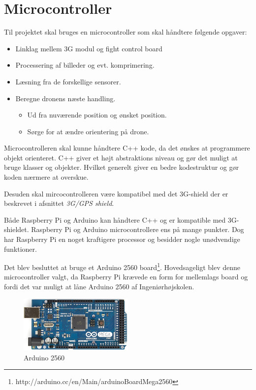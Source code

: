 \section{Microcontroller}

Til projektet skal bruges en microcontroller som skal håndtere følgende opgaver:  
\begin{itemize}
	\item Linklag mellem 3G modul og fight control board
	\item Processering af billeder og evt. komprimering.
	\item Læsning fra de forskellige sensorer.
	\item Beregne dronens næste handling. 
	\begin{itemize}
		\item Ud fra nuværende position og ønsket position.
		\item Sørge for at ændre orientering på drone. 
	\end{itemize}
\end{itemize}

\vspace{0.5cm}

Microcontrolleren skal kunne håndtere C++ kode, da det ønskes at programmere objekt orienteret. C++ giver et højt abstraktions niveau og gør det muligt at bruge klasser og objekter. Hvilket generelt giver en bedre kodestruktur og gør koden nærmere at overskue.

Desuden skal mircocontrolleren være kompatibel med det 3G-shield der er beskrevet i afsnittet \textit{3G/GPS shield}. 

Både Raspberry Pi og Arduino kan håndtere C++ og er kompatible med 3G-shieldet. Raspberry Pi og Arduino microcontrollere ens på mange punkter. Dog har Raspberry Pi en noget kraftigere processor og besidder nogle unødvendige funktioner. 

Det blev besluttet at bruge et Arduino 2560 board\footnote{http://arduino.cc/en/Main/arduinoBoardMega2560}. Hovedsageligt blev denne microcontroller valgt, da Raspberry Pi krævede en form for mellemlags board og fordi det var muligt at låne Arduino 2560 af Ingeniørhøjskolen. 

\vspace{0.5cm}

\begin{figure}[H]
\centering
\includegraphics[width=0.5\textwidth]{Billeder/ArduinoMega2560.png}
\caption{Arduino 2560}
\label{fig:Arduino_2560}
\end{figure}


